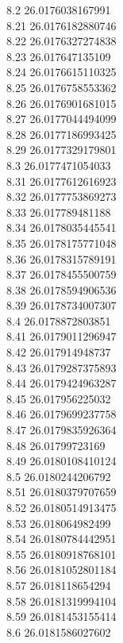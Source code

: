 {8.2	26.0176038167991\\
8.21	26.0176182880746\\
8.22	26.0176327274838\\
8.23	26.017647135109\\
8.24	26.0176615110325\\
8.25	26.0176758553362\\
8.26	26.0176901681015\\
8.27	26.0177044494099\\
8.28	26.0177186993425\\
8.29	26.0177329179801\\
8.3	26.0177471054033\\
8.31	26.0177612616923\\
8.32	26.0177753869273\\
8.33	26.017789481188\\
8.34	26.0178035445541\\
8.35	26.0178175771048\\
8.36	26.0178315789191\\
8.37	26.0178455500759\\
8.38	26.0178594906536\\
8.39	26.0178734007307\\
8.4	26.0178872803851\\
8.41	26.0179011296947\\
8.42	26.017914948737\\
8.43	26.0179287375893\\
8.44	26.0179424963287\\
8.45	26.017956225032\\
8.46	26.0179699237758\\
8.47	26.0179835926364\\
8.48	26.01799723169\\
8.49	26.0180108410124\\
8.5	26.0180244206792\\
8.51	26.0180379707659\\
8.52	26.0180514913475\\
8.53	26.018064982499\\
8.54	26.0180784442951\\
8.55	26.0180918768101\\
8.56	26.0181052801184\\
8.57	26.018118654294\\
8.58	26.0181319994104\\
8.59	26.0181453155414\\
8.6	26.0181586027602\\
}
